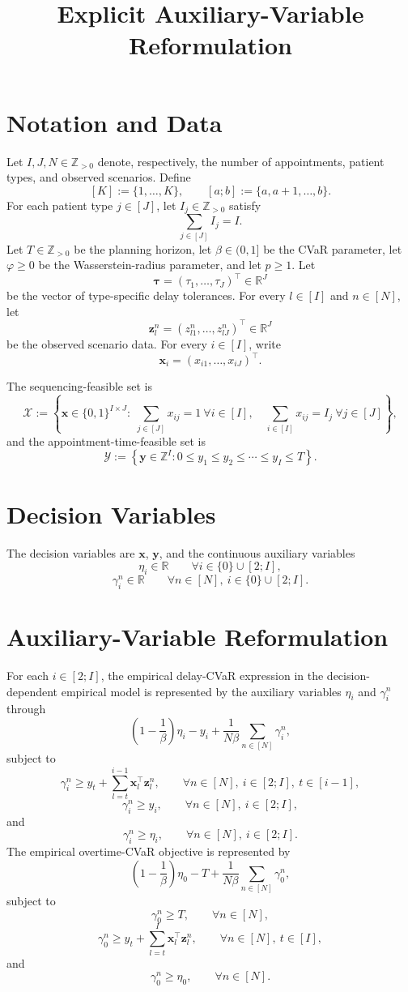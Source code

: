 \documentclass[12pt,a4paper]{article}
\title{Explicit Auxiliary-Variable Reformulation}
\author{}
\date{}
\begin{document}
\maketitle

\section*{Notation and Data}
Let $I,J,N\in\mathbb{Z}_{>0}$ denote, respectively, the number of appointments, patient types, and observed scenarios. Define
\[
[K]:=\{1,\ldots,K\},
\qquad
[a;b]:=\{a,a+1,\ldots,b\}.
\]
For each patient type $j\in[J]$, let $I_j\in\mathbb{Z}_{>0}$ satisfy
\[
\sum_{j\in[J]} I_j=I.
\]
Let $T\in\mathbb{Z}_{>0}$ be the planning horizon, let $\beta\in(0,1]$ be the CVaR parameter, let $\varphi\ge 0$ be the Wasserstein-radius parameter, and let $p\ge 1$. Let
\[
\boldsymbol{\tau}=(\tau_1,\ldots,\tau_J)^\top\in\mathbb{R}^J
\]
be the vector of type-specific delay tolerances. For every $l\in[I]$ and $n\in[N]$, let
\[
\boldsymbol{z}_l^n=(z_{l1}^n,\ldots,z_{lJ}^n)^\top\in\mathbb{R}^J
\]
be the observed scenario data. For every $i\in[I]$, write
\[
\boldsymbol{x}_i=(x_{i1},\ldots,x_{iJ})^\top.
\]

The sequencing-feasible set is
\[
\mathcal{X}:=\left\{
\boldsymbol{x}\in\{0,1\}^{I\times J}:\;
\sum_{j\in[J]}x_{ij}=1\ \forall i\in[I],\quad
\sum_{i\in[I]}x_{ij}=I_j\ \forall j\in[J]
\right\},
\]
and the appointment-time-feasible set is
\[
\mathcal{Y}:=\left\{
\boldsymbol{y}\in\mathbb{Z}^I:
0\le y_1\le y_2\le\cdots\le y_I\le T
\right\}.
\]

\section*{Decision Variables}
The decision variables are $\boldsymbol{x}$, $\boldsymbol{y}$, and the continuous auxiliary variables
\[
\eta_i\in\mathbb{R}
\qquad \forall i\in\{0\}\cup[2;I],
\]
\[
\gamma_i^n\in\mathbb{R}
\qquad \forall n\in[N],\ i\in\{0\}\cup[2;I].
\]

\section*{Auxiliary-Variable Reformulation}
For each $i\in[2;I]$, the empirical delay-CVaR expression in the decision-dependent empirical model is represented by the auxiliary variables $\eta_i$ and $\gamma_i^n$ through
\[
\left(1-\frac{1}{\beta}\right)\eta_i-y_i
+\frac{1}{N\beta}\sum_{n\in[N]}\gamma_i^n,
\]
subject to
\[
\gamma_i^n\ge y_t+
\sum_{l=t}^{i-1}\boldsymbol{x}_l^\top\boldsymbol{z}_l^n,
\qquad \forall n\in[N],\ i\in[2;I],\ t\in[i-1],
\]
\[
\gamma_i^n\ge y_i,
\qquad \forall n\in[N],\ i\in[2;I],
\]
and
\[
\gamma_i^n\ge\eta_i,
\qquad \forall n\in[N],\ i\in[2;I].
\]
The empirical overtime-CVaR objective is represented by
\[
\left(1-\frac{1}{\beta}\right)\eta_0-T
+\frac{1}{N\beta}\sum_{n\in[N]}\gamma_0^n,
\]
subject to
\[
\gamma_0^n\ge T,
\qquad \forall n\in[N],
\]
\[
\gamma_0^n\ge y_t+
\sum_{l=t}^{I}\boldsymbol{x}_l^\top\boldsymbol{z}_l^n,
\qquad \forall n\in[N],\ t\in[I],
\]
and
\[
\gamma_0^n\ge\eta_0,
\qquad \forall n\in[N].
\]
\end{document}
